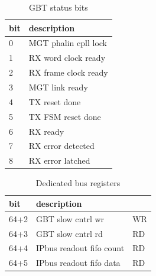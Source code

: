 \documentclass{article}
\begin{document}
\begin{table}[H]
\centering
\begin{tabular}{| l | l |}
\hline
bit & description \\ \hline
0 & MGT phalin cpll lock \\ \hline
1 & RX word clock ready \\ \hline
2 & RX frame clock ready \\ \hline
3 & MGT link ready \\ \hline
4 & TX reset done \\ \hline
5 & TX FSM reset done \\ \hline
6 & RX ready \\ \hline
7 & RX error detected \\ \hline
8 & RX error latched \\ \hline
\end{tabular}
\caption{GBT status bits\label{tab14}}
\end{table}


\begin{table}[H]
\centering
\begin{tabular}{| l | l | l |}
\hline
bit & description \\ \hline
64+2 & GBT slow cntrl wr & WR \\ \hline
64+3 & GBT slow cntrl rd & RD \\ \hline
64+4 & IPbus readout fifo count & RD \\ \hline
64+5 & IPbus readout fifo data & RD \\ \hline
\end{tabular}
\caption{Dedicated bus registers\label{tab15}}
\end{table}
\end{document}

